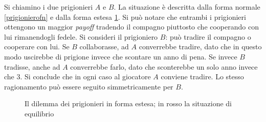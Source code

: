 Si chiamino i due prigionieri $A$ e $B$.
La situazione è descritta dalla forma normale \ref{prigionierofn} e dalla forma estesa \ref{extensive}.
Si può notare che entrambi i prigionieri ottengono un maggior \emph{payoff} tradendo il compagno piuttosto che cooperando con lui rimanendogli fedele.
Si consideri il prigioniero $B$: può tradire il compagno o cooperare con lui.
Se $B$ collaborasse, ad $A$ converrebbe tradire, dato che in questo modo uscirebbe di prigione invece che scontare un anno di pena.
Se invece $B$ tradisse, anche ad $A$ converrebbe farlo, dato che sconterebbe un solo anno invece che 3.
Si conclude che in ogni caso al giocatore $A$ conviene tradire.
Lo stesso ragionamento può essere seguito simmetricamente per $B$.


\begin{center}
   
\begin{figure}[!htbp]




    \caption{Il dilemma dei prigionieri in forma estesa; in rosso la situazione di equilibrio}
    \label{extensive}
\end{figure}
\end{center}


